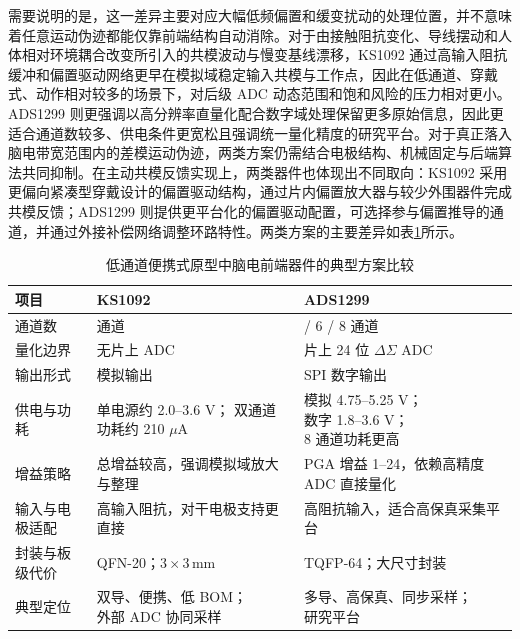需要说明的是，这一差异主要对应大幅低频偏置和缓变扰动的处理位置，并不意味着任意运动伪迹都能仅靠前端结构自动消除。对于由接触阻抗变化、导线摆动和人体相对环境耦合改变所引入的共模波动与慢变基线漂移，KS1092 通过高输入阻抗缓冲和偏置驱动网络更早在模拟域稳定输入共模与工作点，因此在低通道、穿戴式、动作相对较多的场景下，对后级 ADC 动态范围和饱和风险的压力相对更小\cite{usakli2010eeg_frontend}。ADS1299 则更强调以高分辨率直量化配合数字域处理保留更多原始信息，因此更适合通道数较多、供电条件更宽松且强调统一量化精度的研究平台。对于真正落入脑电带宽范围内的差模运动伪迹，两类方案仍需结合电极结构、机械固定与后端算法共同抑制。在主动共模反馈实现上，两类器件也体现出不同取向：KS1092 采用更偏向紧凑型穿戴设计的偏置驱动结构，通过片内偏置放大器与较少外围器件完成共模反馈；ADS1299 则提供更平台化的偏置驱动配置，可选择参与偏置推导的通道，并通过外接补偿网络调整环路特性。两类方案的主要差异如表\ref{tab:c3_afe_compare}所示。

\begin{table}[htbp]
    \centering
    \caption{低通道便携式原型中脑电前端器件的典型方案比较}
    \label{tab:c3_afe_compare}
    \scriptsize
    \begingroup
    \renewcommand{\arraystretch}{1.18}
    \setlength{\tabcolsep}{3.5pt}
    \begin{tabularx}{\linewidth}{@{}>{\raggedright\arraybackslash}p{1.9cm}>{\raggedright\arraybackslash}X>{\raggedright\arraybackslash}X@{}}
        \toprule[1.5pt]
        项目 & KS1092 & ADS1299 \\
        \midrule[1pt]
        通道数 & 2 通道 & 4 / 6 / 8 通道 \\
        量化边界 & 无片上 ADC & 片上 24 位 $\Delta\Sigma$ ADC \\
        输出形式 & 模拟输出 & SPI 数字输出 \\
        供电与功耗 & \makecell[tl]{单电源约 2.0--3.6 V；\\双通道功耗约 210 $\mu$A} & \makecell[tl]{模拟 4.75--5.25 V；\\数字 1.8--3.6 V；\\8 通道功耗更高} \\
        增益策略 & 总增益较高，强调模拟域放大与整理 & PGA 增益 1--24，依赖高精度 ADC 直接量化 \\
        输入与电极适配 & 高输入阻抗，对干电极支持更直接 & 高阻抗输入，适合高保真采集平台 \\
        封装与板级代价 & QFN-20；$3\times 3\,\mathrm{mm}$ & TQFP-64；大尺寸封装 \\
        典型定位 & \makecell[tl]{双导、便携、低 BOM；\\外部 ADC 协同采样} & \makecell[tl]{多导、高保真、同步采样；\\研究平台} \\
        \bottomrule[1.5pt]
    \end{tabularx}
    \endgroup
\end{table}

